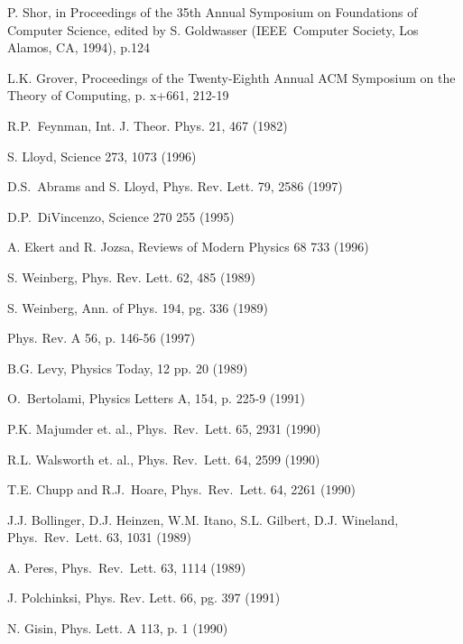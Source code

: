 \documentclass[12pt]{article}
\begin{document}
\begin{thebibliography}{99}
P. Shor, in Proceedings of the 35th Annual Symposium on
Foundations of Computer Science, edited by S. Goldwasser (IEEE\ Computer
Society, Los Alamos, CA, 1994), p.124

L.K. Grover, Proceedings of the Twenty-Eighth Annual ACM
Symposium on the Theory of Computing, p. x+661, 212-19

R.P.\ Feynman, Int. J. Theor. Phys. 21, 467 (1982)

S. Lloyd, Science 273, 1073 (1996)

D.S.\ Abrams and S. Lloyd, Phys. Rev. Lett. 79, 2586 (1997)

D.P.\ DiVincenzo, Science 270 255 (1995)

A. Ekert and R. Jozsa, Reviews of Modern Physics 68 733 (1996)

S. Weinberg, Phys. Rev. Lett. 62, 485 (1989)

S. Weinberg, Ann. of Phys. 194, pg. 336 (1989)

Phys. Rev. A 56, p. 146-56 (1997)

B.G. Levy, Physics Today, 12 pp. 20 (1989)

O.\ Bertolami, Physics Letters A, 154, p. 225-9 (1991)

P.K. Majumder et. al., Phys.\ Rev.\ Lett. 65, 2931 (1990)

R.L. Walsworth et. al., Phys. Rev.\ Lett. 64, 2599 (1990)

T.E. Chupp and R.J.\ Hoare, Phys.\ Rev.\ Lett. 64, 2261 (1990)

J.J. Bollinger, D.J. Heinzen, W.M. Itano, S.L. Gilbert,
D.J. Wineland, Phys.\ Rev.\ Lett. 63, 1031 (1989)

A. Peres, Phys.\ Rev.\ Lett. 63, 1114 (1989)

J. Polchinksi, Phys. Rev. Lett. 66, pg. 397 (1991)

N. Gisin, Phys. Lett. A 113, p. 1 (1990)
\end{thebibliography}
\end{document}
